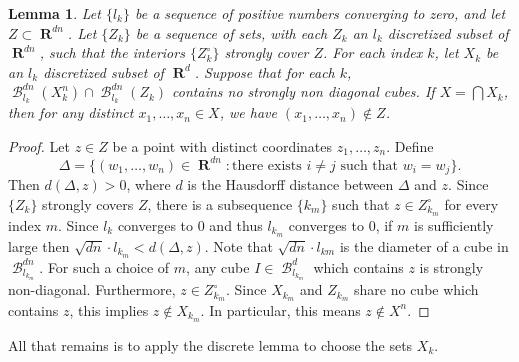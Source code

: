 \documentclass[dvipsnames,letterpaper,12pt]{article}
\numberwithin{equation}{section}
\theoremstyle{plain}
\newtheorem{lemma}{Lemma}
\theoremstyle{remark}
\DeclareMathOperator{\RR}{\mathbf{R}}
\DeclareMathOperator{\setcolon}{\colon}
\DeclareMathOperator{\B}{\mathcal{B}}
\begin{document}
\begin{lemma} \label{stronglydiagonal}
	Let $\{ l_k \}$ be a sequence of positive numbers converging to zero, and let $Z \subset \RR^{dn}$. Let $\{ Z_k \}$ be a sequence of sets, with each $Z_k$ an $l_k$ discretized subset of $\RR^{dn}$, such that the interiors $\{ Z_k^\circ \}$ strongly cover $Z$. For each index $k$, let $X_k$ be an $l_k$ discretized subset of $\RR^d$. Suppose that for each $k$, $\B^{dn}_{l_k}(X_k^n) \cap \B^{dn}_{l_k}(Z_k)$ contains no strongly non diagonal cubes. If $X = \bigcap X_k$, then for any distinct $x_1, \dots, x_n \in X$, we have $(x_1, \dots, x_n) \not \in Z$.
\end{lemma}
\begin{proof}
	Let $z \in Z$ be a point with distinct coordinates $z_1, \dots, z_n$. Define
	\[ \Delta = \{ (w_1, \dots, w_n) \in \RR^{dn} \setcolon \text{there exists $i \neq j$ such that $w_i = w_j$} \}. \]
	Then $d(\Delta,z) > 0$, where $d$ is the Hausdorff distance between $\Delta$ and $z$. Since $\{ Z_k \}$ strongly covers $Z$, there is a subsequence $\{ k_m \}$ such that $z \in Z_{k_m}^\circ$ for every index $m$. Since $l_k$ converges to 0 and thus $l_{k_m}$ converges to $0$, if $m$ is sufficiently large then $\sqrt{dn} \cdot l_{k_m} < d(\Delta,z)$. Note that $\sqrt{dn} \cdot l_{km}$ is the diameter of a cube in $\B_{l_{k_m}}^{dn}$. For such a choice of $m$, any cube $I \in \B^d_{l_{k_m}}$ which contains $z$ is strongly non-diagonal. Furthermore, $z \in Z_{k_m}^\circ$. Since $X_{k_m}$ and $Z_{k_m}$ share no cube which contains $z$, this implies $z \not \in X_{k_m}$. In particular, this means $z \not\in X^n$.
\end{proof}

All that remains is to apply the discrete lemma to choose the sets $X_k$.
\end{document}
